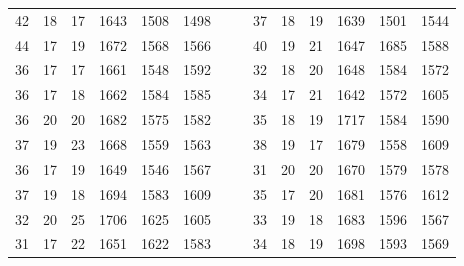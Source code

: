 \documentclass[12pt]{article}
\begin{document}
\begin{center}
\begin{tabular}{c c c | c c c c c c c c | c c c}
42 & 18 & 17 & 1643 & 1508 & 1498 & & & 37 & 18 & 19 & 1639 & 1501 & 1544\\
44 & 17 & 19 & 1672 & 1568 & 1566 & & & 40 & 19 & 21 & 1647 & 1685 & 1588\\
36 & 17 & 17 & 1661 & 1548 & 1592 & & & 32 & 18 & 20 & 1648 & 1584 & 1572\\
36 & 17 & 18 & 1662 & 1584 & 1585 & & & 34 & 17 & 21 & 1642 & 1572 & 1605\\
36 & 20 & 20 & 1682 & 1575 & 1582 & & & 35 & 18 & 19 & 1717 & 1584 & 1590\\
37 & 19 & 23 & 1668 & 1559 & 1563 & & & 38 & 19 & 17 & 1679 & 1558 & 1609\\
36 & 17 & 19 & 1649 & 1546 & 1567 & & & 31 & 20 & 20 & 1670 & 1579 & 1578\\
37 & 19 & 18 & 1694 & 1583 & 1609 & & & 35 & 17 & 20 & 1681 & 1576 & 1612\\
32 & 20 & 25 & 1706 & 1625 & 1605 & & & 33 & 19 & 18 & 1683 & 1596 & 1567\\
31 & 17 & 22 & 1651 & 1622 & 1583 & & & 34 & 18 & 19 & 1698 & 1593 & 1569\\

\end{tabular}
\end{center}
\end{document}
